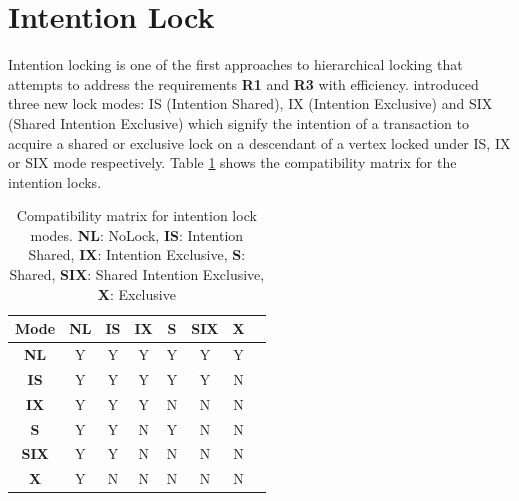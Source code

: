 \section{Intention Lock}

Intention locking is one of the first approaches to hierarchical locking that attempts to address the requirements \textbf{R1} and \textbf{R3} with efficiency.
\citet{gray1993granularity} introduced three new lock modes: IS (Intention Shared), IX (Intention Exclusive) and SIX (Shared Intention Exclusive) which signify the intention of a transaction to acquire a shared or exclusive lock on a descendant of a vertex locked under IS, IX or SIX mode respectively.
Table \ref{tab:intention_locks} shows the compatibility matrix for the intention locks.


\begin{table}
    \centering
    \captionsetup{justification=centering}
    \begin{tabular}{c|ccccccc}
        \textbf{Mode} & \textbf{NL} & \textbf{IS} & \textbf{IX} & \textbf{S} & \textbf{SIX} & \textbf{X}\\
        \hline
        \textbf{NL} & \cellcolor{green!25} Y & \cellcolor{green!25} Y & \cellcolor{green!25} Y & \cellcolor{green!25} Y & \cellcolor{green!25} Y & \cellcolor{green!25} Y \\
        \textbf{IS} &  \cellcolor{green!25} Y & \cellcolor{green!25} Y & \cellcolor{green!25} Y & \cellcolor{green!25} Y & \cellcolor{green!25} Y & \cellcolor{red!25} N \\
        \textbf{IX} &  \cellcolor{green!25} Y & \cellcolor{green!25} Y & \cellcolor{green!25} Y & \cellcolor{red!25} N & \cellcolor{red!25} N & \cellcolor{red!25} N \\
        \textbf{S} &  \cellcolor{green!25} Y & \cellcolor{green!25} Y & \cellcolor{red!25} N & \cellcolor{green!25} Y & \cellcolor{red!25} N & \cellcolor{red!25} N \\
        \textbf{SIX} &  \cellcolor{green!25} Y & \cellcolor{green!25} Y & \cellcolor{red!25} N & \cellcolor{red!25} N & \cellcolor{red!25} N & \cellcolor{red!25} N \\
        \textbf{X} &  \cellcolor{green!25} Y & \cellcolor{red!25} N & \cellcolor{red!25} N & \cellcolor{red!25} N & \cellcolor{red!25} N & \cellcolor{red!25} N \\
    \end{tabular}
    \caption{Compatibility matrix for intention lock modes. \textbf{NL}: NoLock, \textbf{IS}: Intention Shared, \textbf{IX}: Intention Exclusive, \textbf{S}: Shared, \textbf{SIX}: Shared Intention Exclusive, \textbf{X}: Exclusive}
    \label{tab:intention_locks}
\end{table}



